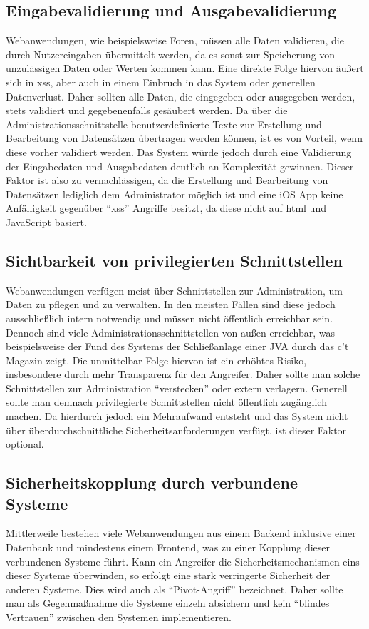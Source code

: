 \subsection{Eingabevalidierung und Ausgabevalidierung}
Webanwendungen, wie beispielsweise Foren, müssen alle Daten validieren, die durch Nutzereingaben übermittelt werden, da es sonst zur Speicherung von unzulässigen Daten oder Werten kommen kann. Eine direkte Folge hiervon äußert sich in \gls{xss}, aber auch in einem Einbruch in das System oder generellen Datenverlust.
Daher sollten alle Daten, die eingegeben oder ausgegeben werden, stets validiert und gegebenenfalls gesäubert werden.
Da über die Administrationsschnittstelle benutzerdefinierte Texte zur Erstellung und Bearbeitung von Datensätzen übertragen werden können, ist es von Vorteil, wenn diese vorher validiert werden. Das System würde jedoch durch eine Validierung der Eingabedaten und Ausgabedaten deutlich an Komplexität gewinnen. Dieser Faktor ist also zu vernachlässigen, da die Erstellung und Bearbeitung von Datensätzen lediglich dem Administrator möglich ist und eine iOS App keine Anfälligkeit gegenüber \enquote{xss} Angriffe besitzt, da diese nicht auf \gls{html} und JavaScript basiert.

\subsection{Sichtbarkeit von privilegierten Schnittstellen}
Webanwendungen verfügen meist über Schnittstellen zur Administration, um Daten zu pflegen und zu verwalten.
In den meisten Fällen sind diese jedoch ausschließlich intern notwendig und müssen nicht öffentlich erreichbar sein.
Dennoch sind viele Administrationsschnittstellen von außen erreichbar, was beispielsweise der Fund des Systems der Schließanlage einer JVA durch das c’t Magazin zeigt.
Die unmittelbar Folge hiervon ist ein erhöhtes Risiko, insbesondere durch mehr Transparenz für den Angreifer.
Daher sollte man solche Schnittstellen zur Administration \enquote{verstecken} oder extern verlagern.
Generell sollte man demnach privilegierte Schnittstellen nicht öffentlich zugänglich machen. Da hierdurch jedoch ein Mehraufwand entsteht und das System nicht über überdurchschnittliche Sicherheitsanforderungen verfügt, ist dieser Faktor optional.

\subsection{Sicherheitskopplung durch verbundene Systeme}
Mittlerweile bestehen viele Webanwendungen aus einem Backend inklusive einer Datenbank und mindestens einem Frontend, was zu einer Kopplung dieser verbundenen Systeme führt. Kann ein Angreifer die Sicherheitsmechanismen eins dieser Systeme überwinden, so erfolgt eine stark verringerte Sicherheit der anderen Systeme. Dies wird auch als \enquote{Pivot-Angriff} bezeichnet.
Daher sollte man als Gegenmaßnahme die Systeme einzeln absichern und kein \enquote{blindes Vertrauen} zwischen den Systemen implementieren.

